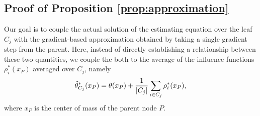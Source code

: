 \documentclass[aos]{imsart}
\theoremstyle{plain}
\theoremstyle{definition}
\theoremstyle{remark}
\begin{document}
\begin{CJK}{UTF8}{gbsn}
\begin{appendix}
\subsection*{Proof of Proposition \ref{prop:approximation}}

Our goal is to couple the actual solution  of the estimating equation
over the leaf $C_j$ with the gradient-based approximation  obtained
by taking a single gradient step from the parent. Here, instead of directly establishing
a relationship between these two quantities, we couple the both to the average of the
influence functions $\rho_i^*(x_P)$ averaged over $C_j$, namely
\begin{equation}
\label{eq:influence_child}
\ttheta_{C_j}^*(x_P) = \theta(x_P) + \frac{1}{\abs{C_j}} \sum_{i \in C_j} \rho_i^*(x_P),
\end{equation}
where $x_P$ is the center of mass of the parent node $P$.


\end{appendix}
\end{CJK}
\end{document}

